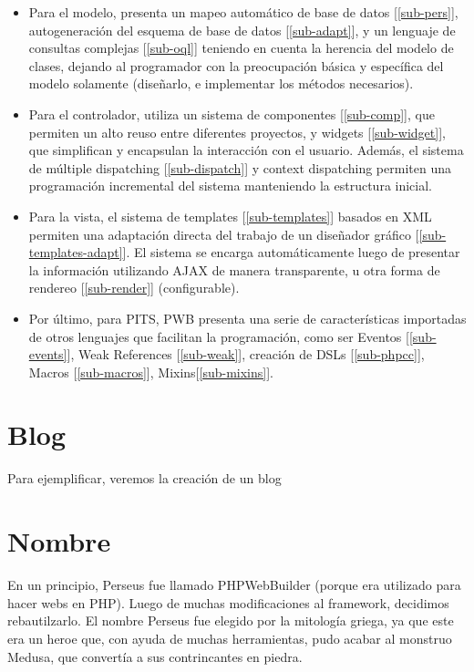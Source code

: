 \documentclass[a4paper,10pt]{article}
\begin{document}
\begin{itemize}
\item Para el modelo, presenta un mapeo automático de base de datos [\ref{sub-pers}], autogeneración del esquema de base de datos [\ref{sub-adapt}],
y un lenguaje de consultas complejas [\ref{sub-oql}] teniendo en cuenta la herencia del modelo de clases, dejando al programador
con la preocupación básica y específica del modelo solamente (diseñarlo, e implementar los métodos necesarios).

\item Para el controlador, utiliza un sistema de componentes [\ref{sub-comp}], que permiten un alto reuso entre
diferentes proyectos, y widgets [\ref{sub-widget}], que simplifican y encapsulan la interacción con el usuario.
Además, el sistema de múltiple dispatching [\ref{sub-dispatch}] y context dispatching permiten una programación
incremental del sistema manteniendo la estructura inicial.

\item Para la vista, el sistema de templates [\ref{sub-templates}] basados en XML permiten una adaptación directa del
trabajo de un diseñador gráfico [\ref{sub-templates-adapt}]. El sistema se encarga automáticamente luego de presentar la información
utilizando AJAX de manera transparente, u otra forma de rendereo [\ref{sub-render}] (configurable).

\item Por último, para PITS, PWB presenta una serie de características importadas de otros lenguajes que facilitan
la programación, como ser Eventos [\ref{sub-events}], Weak References [\ref{sub-weak}], creación de DSLs [\ref{sub-phpcc}],
Macros [\ref{sub-macros}], Mixins[\ref{sub-mixins}].
\end{itemize}

\section{Blog}
Para ejemplificar, veremos la creación de un blog


\section{Nombre}

En un principio, Perseus fue llamado PHPWebBuilder (porque era utilizado para hacer webs en PHP). Luego de muchas modificaciones al framework, decidimos
rebautilzarlo. El nombre Perseus fue elegido por la mitología griega, ya que este era un heroe que, con ayuda de muchas herramientas, pudo acabar
al monstruo Medusa, que convertía a sus contrincantes en piedra.
\end{document}
